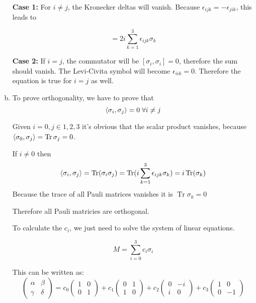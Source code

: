 \documentclass[a4paper,german,12pt,smallheadings]{scrartcl}
\DeclareMathOperator{\Tr}{Tr}
\begin{document}
\begin{enumerate}[a)]
    \textbf{Case 1:} For $i \neq j$, the Kronecker deltas will vanish.  Because $\epsilon_{ijk}
    = -\epsilon_{jik}$, this leads to

    \begin{equation*}
      [\sigma_i, \sigma_j] = 2i \sum_{k=1}^3 \epsilon_{ijk} \sigma_k
    \end{equation*}

    \textbf{Case 2:} If $i=j$, the commutator will be $[\sigma_i, \sigma_i] =
    0$, therefore the sum should vanish. The Levi-Civita symbol will
    become $\epsilon_{iik} = 0$. Therefore the equation is true for $i = j$ as
    well.
  \item
    To prove orthogonality, we have to prove that
    \begin{equation*}
      \braket{\sigma_i, \sigma_j} = 0 \; \forall i \neq j
    \end{equation*}

    Given $i=0, j \in {1,2,3}$ it's obvious that the scalar product vanishes,
    because $\braket{\sigma_0, \sigma_j} = \Tr \sigma_j = 0$.

    If $i \neq 0$ then
    \begin{equation*}
      \braket{\sigma_i, \sigma_j} = \Tr(\sigma_i \sigma_j) = \Tr(i \sum_{k=1}^3 \epsilon_{ijk} \sigma_k) = i \Tr(\sigma_k)
    \end{equation*}
    Because the trace of all Pauli matrices vanishes it is $\Tr \sigma_k = 0$

    Therefore all Pauli matricies are orthogonal.

    To calculate the $c_i$, we just need to solve the system of linear equations.

    \begin{equation*}
    M = \sum_{i=0}^3 c_i \sigma_i
    \end{equation*}

    This can be written as:
    \begin{equation*}
      \begin{pmatrix}
        \alpha & \beta \\ \gamma & \delta
      \end{pmatrix}
      =
      c_0
      \begin{pmatrix}
        1 & 0 \\
        0 & 1
      \end{pmatrix}
      +
      c_1
      \begin{pmatrix}
        0 & 1 \\
        1 & 0
      \end{pmatrix}
      +
      c_2
      \begin{pmatrix}
        0 & -i \\
        i & 0
      \end{pmatrix}
      +
      c_3
      \begin{pmatrix}
        1 & 0 \\
        0 & -1
      \end{pmatrix}
    \end{equation*}


\end{enumerate}
\end{document}
